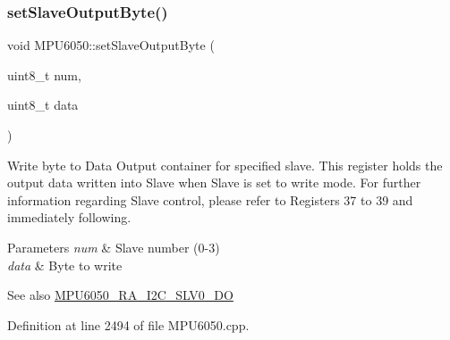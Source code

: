\begin{DoxyCode}{0}

\end{DoxyCode}
\mbox{\label{classMPU6050_a34a1def575f6abcd464afe954de8a461}} 
\subsubsection{\texorpdfstring{setSlaveOutputByte()}{setSlaveOutputByte()}}
{\footnotesize\ttfamily void M\+P\+U6050\+::set\+Slave\+Output\+Byte (\begin{DoxyParamCaption}\item[{uint8\+\_\+t}]{num,  }\item[{uint8\+\_\+t}]{data }\end{DoxyParamCaption})}

Write byte to Data Output container for specified slave. This register holds the output data written into Slave when Slave is set to write mode. For further information regarding Slave control, please refer to Registers 37 to 39 and immediately following. 
\begin{DoxyParams}{Parameters}
{\em num} & Slave number (0-\/3) \\
\hline
{\em data} & Byte to write \\
\hline
\end{DoxyParams}
\begin{DoxySeeAlso}{See also}
\mbox{\hyperlink{MPU6050_8h_a53ca9562881303b665299907726fb753}{M\+P\+U6050\+\_\+\+R\+A\+\_\+\+I2\+C\+\_\+\+S\+L\+V0\+\_\+\+DO}} 
\end{DoxySeeAlso}


Definition at line 2494 of file M\+P\+U6050.\+cpp.


